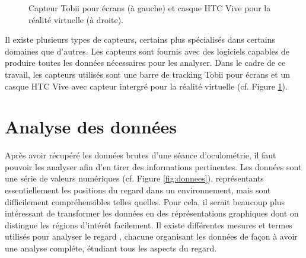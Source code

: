 \documentclass[hidelinks,12pt]{article}
\begin{document}
\begin{figure}[htpb]
  \centering
  \qquad
  \caption{Capteur Tobii \cite{img_tobii} pour écrans (à gauche) et casque HTC
    Vive \cite{img_htcvive} pour la réalité virtuelle (à droite).}
  \label{fig:materiel}
\end{figure}

Il existe plusieurs types de capteurs, certains plus spécialisés dans certains
domaines que d'autres. Les capteurs sont fournis avec des logiciels capables de
produire toutes les données nécessaires pour les analyser. Dans le cadre de ce
travail, les capteurs utilisés sont une barre de tracking Tobii pour écrans et
un casque HTC Vive avec capteur intergré pour la réalité virtuelle (cf. Figure
\ref{fig:materiel}).


\section{Analyse des données}

Après avoir récupéré les données brutes d'une séance d'oculométrie, il faut
pouvoir les analyser afin d'en tirer des informations pertinentes. Les
données sont une série de valeurs numériques (cf. Figure \ref{fig:donnees}),
représentants essentiellement les positions du regard dans un environnement,
mais sont difficilement compréhensibles telles quelles. Pour cela, il serait
beaucoup plus intéressant de transformer les données en des réprésentations
graphiques dont on distingue les régions d'intérêt facilement. Il existe
différentes mesures et termes  utilisés pour analyser le regard
\cite{imotions_metrics}, chacune organisant les données de façon à avoir une
analyse compléte, étudiant tous les aspects du regard.
\end{document}
